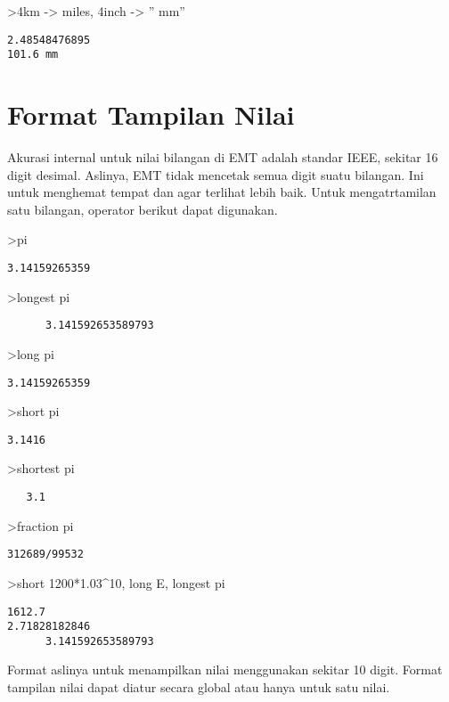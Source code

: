 \documentclass[
]{book}
\begin{document}
\textgreater4km -\textgreater{} miles, 4inch -\textgreater{} '' mm''

\begin{verbatim}
2.48548476895
101.6 mm
\end{verbatim}

\chapter{Format Tampilan Nilai}\label{format-tampilan-nilai}

Akurasi internal untuk nilai bilangan di EMT adalah standar IEEE, sekitar 16 digit desimal. Aslinya, EMT tidak mencetak semua digit suatu bilangan. Ini untuk menghemat tempat dan agar terlihat lebih baik. Untuk mengatrtamilan satu bilangan, operator berikut dapat digunakan.

\textgreater pi

\begin{verbatim}
3.14159265359
\end{verbatim}

\textgreater longest pi

\begin{verbatim}
      3.141592653589793 
\end{verbatim}

\textgreater long pi

\begin{verbatim}
3.14159265359
\end{verbatim}

\textgreater short pi

\begin{verbatim}
3.1416
\end{verbatim}

\textgreater shortest pi

\begin{verbatim}
   3.1 
\end{verbatim}

\textgreater fraction pi

\begin{verbatim}
312689/99532
\end{verbatim}

\textgreater short 1200*1.03\^{}10, long E, longest pi

\begin{verbatim}
1612.7
2.71828182846
      3.141592653589793 
\end{verbatim}

Format aslinya untuk menampilkan nilai menggunakan sekitar 10 digit. Format tampilan nilai dapat diatur secara global atau hanya untuk satu nilai.
\end{document}
